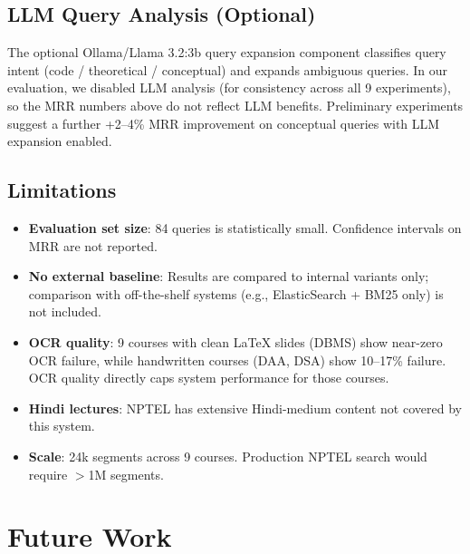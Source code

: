 \documentclass[12pt,a4paper]{article}
\begin{document}
\subsection{LLM Query Analysis (Optional)}

The optional Ollama/Llama 3.2:3b query expansion component classifies query intent (code / theoretical / conceptual) and expands ambiguous queries. In our evaluation, we disabled LLM analysis (for consistency across all 9 experiments), so the MRR numbers above do not reflect LLM benefits. Preliminary experiments suggest a further +2--4\% MRR improvement on conceptual queries with LLM expansion enabled.

\subsection{Limitations}

\begin{itemize}[leftmargin=1.5em]
  \item \textbf{Evaluation set size}: 84 queries is statistically small. Confidence intervals on MRR are not reported.
  \item \textbf{No external baseline}: Results are compared to internal variants only; comparison with off-the-shelf systems (e.g., ElasticSearch + BM25 only) is not included.
  \item \textbf{OCR quality}: 9 courses with clean LaTeX slides (DBMS) show near-zero OCR failure, while handwritten courses (DAA, DSA) show 10--17\% failure. OCR quality directly caps system performance for those courses.
  \item \textbf{Hindi lectures}: NPTEL has extensive Hindi-medium content not covered by this system.
  \item \textbf{Scale}: 24k segments across 9 courses. Production NPTEL search would require $>$1M segments.
\end{itemize}

\newpage

\section{Future Work}
\end{document}
